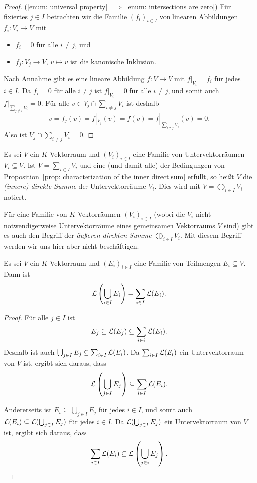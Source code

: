 \documentclass[a4paper,10pt]{scrartcl}
\begin{document}
\begin{proof}
  (\ref{enum: universal property} $\implies$ \ref{enum: intersections are zero})
  Für fixiertes $j \in I$ betrachten wir die Familie $(f_i)_{i \in I}$ von linearen Abbildungen $f_i \colon V_i \to V$ mit
  \begin{itemize}
    \item
      $f_i = 0$ für alle $i \neq j$, und
    \item
      $f_j \colon V_j \to V$, $v \mapsto v$ ist die kanonische Inklusion.
  \end{itemize}
  Nach Annahme gibt es eine lineare Abbildung $f \colon V \to V$ mit $f|_{V_i} = f_i$ für jedes $i \in I$.
  Da $f_i = 0$ für alle $i \neq j$ ist $f|_{V_i} = 0$ für alle $i \neq j$, und somit auch $f|_{\sum_{j \neq i} V_i} = 0$.
  Für alle $v \in V_j \cap \sum_{i \neq j} V_i$ ist deshalb
  \[
      v
    = f_j(v)
    = f|_{V_j}(v)
    = f(v)
    = f|_{\sum_{i \neq j} V_i}(v)
    = 0.
  \]
  Also ist $V_j \cap \sum_{i \neq j} V_i = 0$.
\end{proof}


\begin{definition}
  Es sei $V$ ein $K$-Vektorraum und $(V_i)_{i \in I}$ eine Familie von Untervektorräumen $V_i \subseteq V$.
  Ist $V = \sum_{i \in I} V_i$ und eine (und damit alle) der Bedingungen von Proposition~\ref{prop: characterization of the inner direct sum} erfüllt, so heißt $V$ die \emph{(innere) direkte Summe} der Untervektorräume $V_i$.
  Dies wird mit $V = \bigoplus_{i \in I} V_i$ notiert.
\end{definition}


\begin{remark}
  Für eine Familie von $K$-Vektorräumen $(V_i)_{i \in I}$ (wobei die $V_i$ nicht notwendigerweise Untervektorräume eines gemeinsamen Vektorraums $V$ sind) gibt es auch den Begriff der \emph{äußeren direkten Summe $\bigoplus_{i \in I} V_i$}.
  Mit diesem Begriff werden wir uns hier aber nicht beschäftigen.
\end{remark}


\begin{lemma}
  Es sei $V$ ein $K$-Vektorraum und $(E_i)_{i \in I}$ eine Familie von Teilmengen $E_i \subseteq V$.
  Dann ist
  \[
      \operatorname{\mathcal{L}}\left( \bigcup_{i \in I} E_i \right)
    = \sum_{i \in I} \operatorname{\mathcal{L}}(E_i).
  \]
\end{lemma}


\begin{proof}
  Für alle $j \in I$ ist
  \[
    E_j \subseteq \operatorname{\mathcal{L}}(E_j) \subseteq \sum_{i \in i} \operatorname{\mathcal{L}}(E_i).
  \]
  Deshalb ist auch $\bigcup_{j \in I} E_j \subseteq \sum_{i \in I} \operatorname{\mathcal{L}}(E_i)$.
  Da $\sum_{i \in I} \operatorname{\mathcal{L}}(E_i)$ ein Untervektorraum von $V$ ist, ergibt sich daraus, dass
  \[
              \operatorname{\mathcal{L}}\left( \bigcup_{j \in I} E_j \right)
    \subseteq \sum_{i \in I} \operatorname{\mathcal{L}}(E_i).
  \]
  
  Andererseits ist $E_i \subseteq \bigcup_{j \in I} E_j$ für jedes $i \in I$, und somit auch $\operatorname{\mathcal{L}}(E_i) \subseteq \operatorname{\mathcal{L}}( \bigcup_{j \in I} E_j )$ für jedes $i \in I$.
  Da $\operatorname{\mathcal{L}}( \bigcup_{j \in I} E_j )$ ein Untervektorraum von $V$ ist, ergibt sich daraus, dass
  \[
              \sum_{i \in I} \operatorname{\mathcal{L}}(E_i)
    \subseteq \operatorname{\mathcal{L}}\left( \bigcup_{j \in i} E_j \right).
  \]
\end{proof}
\end{document}
